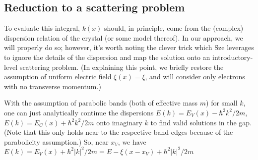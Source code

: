 \subsection{Reduction to a scattering problem}
To evaluate this integral, $k(x)$ should, in principle, come from the (complex) dispersion relation of the crystal (or some model thereof).  In our approach, we will properly do so; however, it's worth noting the clever trick which Sze leverages to ignore the details of the dispersion and map the solution onto an introductory-level scattering problem.  (In explaining this point, we briefly restore the assumption of uniform electric field $\xi(x)=\xi$, and will consider only electrons with no transverse momentum.)

With the assumption of parabolic bands (both of effective mass $m$) for small $k$, one can just analytically continue the dispersions $E(k)=E_V(x)-\hbar^2k^2/2m$, $E(k)=E_C(x)+\hbar^2k^2/2m$ onto imaginary $k$ to find valid solutions in the gap.  (Note that this only holds near to the respective band edges because of the parabolicity assumption.)  So, near $x_V$, we have $E(k)=E_V(x)+\hbar^2|k|^2/2m=E-\xi(x-x_V)+\hbar^2|k|^2/2m$